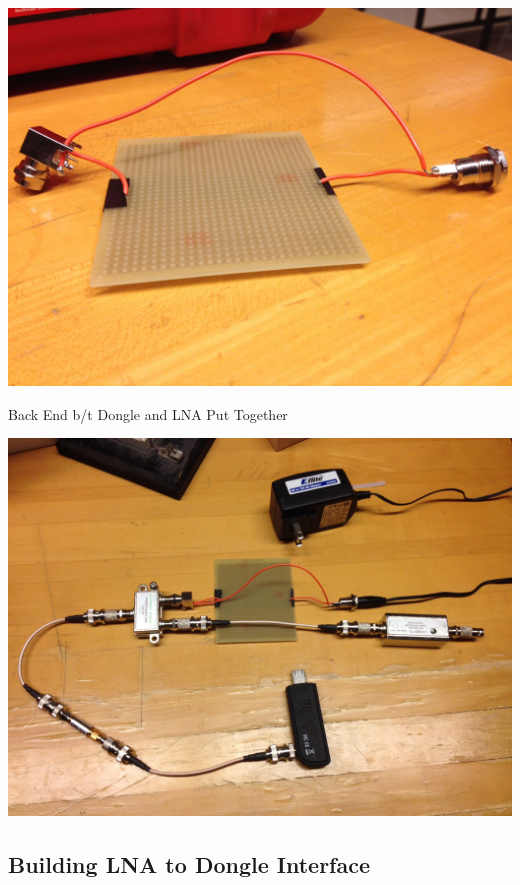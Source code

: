 \documentclass[11pt]{article} %
\begin{document}
\begin{center}
\includegraphics[scale=0.20]{lna/10.jpeg}
\end{center}

Back End b/t Dongle and LNA Put Together 

\begin{center}
\includegraphics[scale=0.20]{lna/11.jpeg}
\end{center}



\subsection{Building LNA to Dongle Interface}
\end{document}
